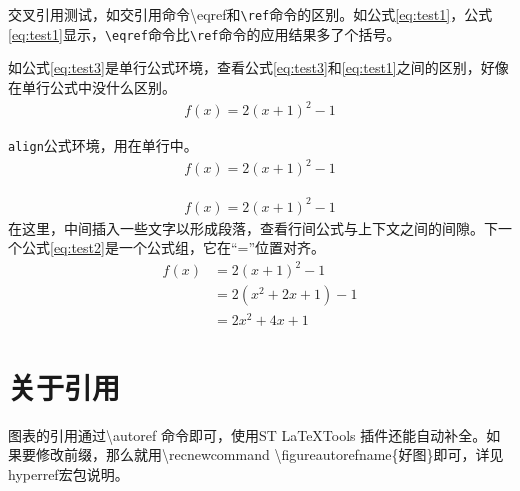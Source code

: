 交叉引用测试，如交引用命令{\ttfamily \textbackslash eqref}和\texttt{\textbackslash ref}命令的区别。如公式\eqref{eq:test1}，公式\ref{eq:test1}显示，\texttt{\textbackslash eqref}命令比\texttt{\textbackslash ref}命令的应用结果多了个括号。

如公式\eqref{eq:test3}是单行公式环境，查看公式\eqref{eq:test3}和\eqref{eq:test1}之间的区别，好像在单行公式中没什么区别。
\begin{align}\label{eq:test3}
	f(x) = 2(x + 1)^{2} - 1
\end{align}

\texttt{align}公式环境，用在单行中。
\begin{align}\label{eq:test1}
	f(x) = 2(x + 1)^{2} - 1
\end{align}

\begin{align*}
	f(x) = 2(x + 1)^{2} - 1
\end{align*}
在这里，中间插入一些文字以形成段落，查看行间公式与上下文之间的间隙。下一个公式\eqref{eq:test2}是一个公式组，它在“=”位置对齐。
\begin{align}\label{eq:test2}
	f(x) & = 2(x + 1)^{2} - 1\\
		 & = 2(x^{2} + 2x +1)-1\\
		 & = 2x^{2} + 4x + 1
\end{align}


\section{关于引用}
图表的引用通过{\ttfamily \textbackslash autoref} 命令即可，使用ST LaTeXTools 插件还能自动补全。如果要修改前缀，那么就用{\ttfamily \textbackslash recnewcommand \textbackslash figureautorefname\{好图\}}即可，详见hyperref宏包说明。
